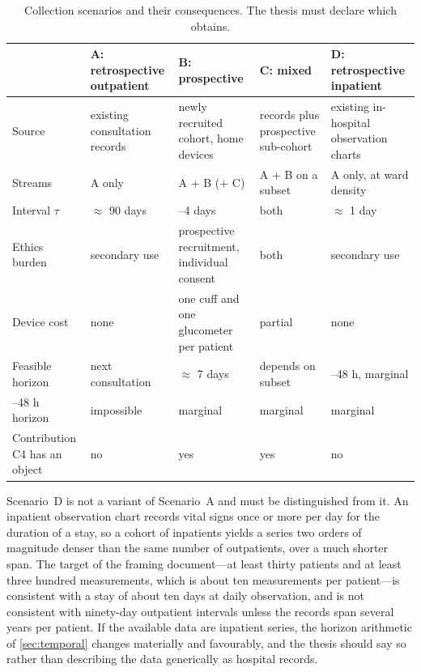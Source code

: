 \documentclass[12pt,a4paper,oneside]{report}
\begin{document}
\begin{table}[htbp]
\centering\footnotesize
\caption{Collection scenarios and their consequences. The thesis must declare which obtains.}\label{tab:scenarios}
\begin{tabularx}{\textwidth}{@{}>{\raggedright\arraybackslash}p{2.3cm} >{\raggedright\arraybackslash}X >{\raggedright\arraybackslash}X >{\raggedright\arraybackslash}X >{\raggedright\arraybackslash}X@{}}
\toprule
 & \textbf{A: retrospective outpatient} & \textbf{B: prospective} & \textbf{C: mixed} & \textbf{D: retrospective inpatient} \\
\midrule
Source & existing consultation records & newly recruited cohort, home devices & records plus prospective sub-cohort & existing in-hospital observation charts \\
Streams & A only & A + B (+ C) & A + B on a subset & A only, at ward density \\
Interval $\tau$ & $\approx$ 90 days & 3--4 days & both & $\approx$ 1 day \\
Ethics burden & secondary use & prospective recruitment, individual consent & both & secondary use \\
Device cost & none & one cuff and one glucometer per patient & partial & none \\
Feasible horizon & next consultation & $\approx$ 7 days & depends on subset & 24--48 h, marginal \\
24--48 h horizon & impossible & marginal & marginal & marginal \\
Contribution C4 has an object & no & yes & yes & no \\
\bottomrule
\end{tabularx}
\end{table}

Scenario~D is not a variant of Scenario~A and must be distinguished from it. An inpatient observation chart records vital signs once or more per day for the duration of a stay, so a cohort of inpatients yields a series two orders of magnitude denser than the same number of outpatients, over a much shorter span. The target of the framing document---at least thirty patients and at least three hundred measurements, which is about ten measurements per patient---is consistent with a stay of about ten days at daily observation, and is not consistent with ninety-day outpatient intervals unless the records span several years per patient. If the available data are inpatient series, the horizon arithmetic of \cref{sec:temporal} changes materially and favourably, and the thesis should say so rather than describing the data generically as hospital records.
\end{document}
